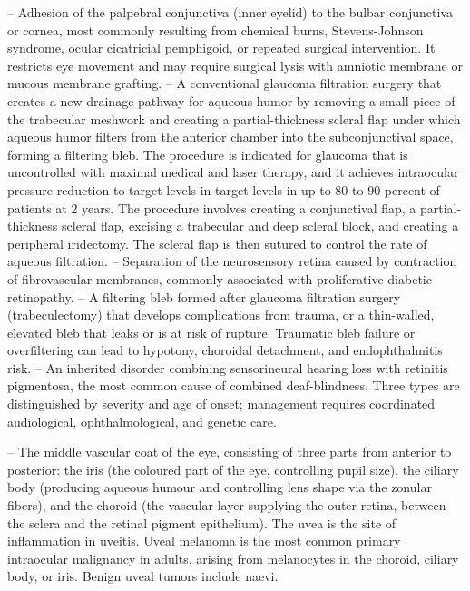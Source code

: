 -- Adhesion of the palpebral conjunctiva (inner eyelid) to the bulbar conjunctiva or cornea, most commonly resulting from chemical burns, Stevens-Johnson syndrome, ocular cicatricial pemphigoid, or repeated surgical intervention. It restricts eye movement and may require surgical lysis with amniotic membrane or mucous membrane grafting.
-- A conventional glaucoma filtration surgery that creates a new drainage pathway for aqueous humor by removing a small piece of the trabecular meshwork and creating a partial-thickness scleral flap under which aqueous humor filters from the anterior chamber into the subconjunctival space, forming a filtering bleb. The procedure is indicated for glaucoma that is uncontrolled with maximal medical and laser therapy, and it achieves intraocular pressure reduction to target levels in target levels in up to 80 to 90 percent of patients at 2 years. The procedure involves creating a conjunctival flap, a partial-thickness scleral flap, excising a trabecular and deep scleral block, and creating a peripheral iridectomy. The scleral flap is then sutured to control the rate of aqueous filtration.
-- Separation of the neurosensory retina caused by contraction of fibrovascular membranes, commonly associated with proliferative diabetic retinopathy.
-- A filtering bleb formed after glaucoma filtration surgery (trabeculectomy) that develops complications from trauma, or a thin-walled, elevated bleb that leaks or is at risk of rupture. Traumatic bleb failure or overfiltering can lead to hypotony, choroidal detachment, and endophthalmitis risk.
-- An inherited disorder combining sensorineural hearing loss with retinitis pigmentosa, the most common cause of combined deaf-blindness. Three types are distinguished by severity and age of onset; management requires coordinated audiological, ophthalmological, and genetic care.

-- The middle vascular coat of the eye, consisting of three parts from anterior to posterior: the iris (the coloured part of the eye, controlling pupil size), the ciliary body (producing aqueous humour and controlling lens shape via the zonular fibers), and the choroid (the vascular layer supplying the outer retina, between the sclera and the retinal pigment epithelium). The uvea is the site of inflammation in uveitis. Uveal melanoma is the most common primary intraocular malignancy in adults, arising from melanocytes in the choroid, ciliary body, or iris. Benign uveal tumors include naevi.

